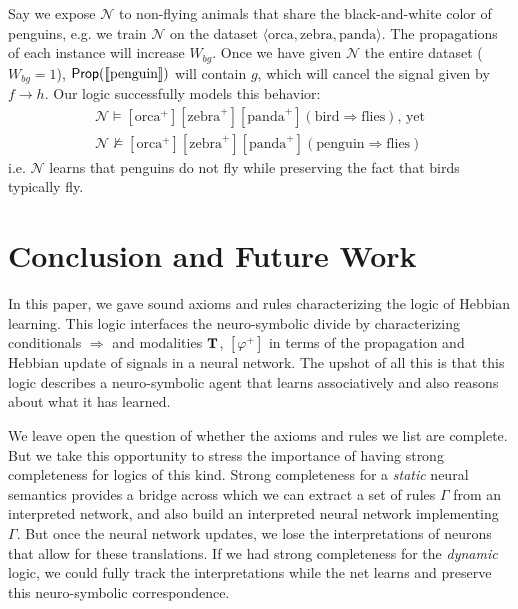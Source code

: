 \documentclass[letterpaper]{article}
\theoremstyle{definition}
\newcommand{\semantics}[1]{[\![\mbox{\em $ #1 $\/}]\!]}
\newcommand{\Typ}{\textrm{\textup{\textbf{T}}}}
\newcommand{\Prop}{\textsf{Prop}}
\newcommand{\Net}{\mathcal{N}}
\begin{document}
Say we expose $\Net$ to non-flying animals that share the black-and-white color of penguins, e.g. we train $\Net$ on the dataset $\langle \textrm{orca}, \textrm{zebra}, \textrm{panda} \rangle$.  The propagations of each instance will increase $W_{bg}$.  Once we have given $\Net$ the entire dataset ($W_{bg} = 1$), $\Prop(\semantics{\textup{penguin}})$ will contain $g$, which will cancel the signal given by ${f \to h}$.  Our logic successfully models this behavior:
\[
\begin{array}{l}
\Net \models [\textrm{orca}^+] [\textrm{zebra}^+] [\textrm{panda}^+] (\textrm{bird} \Rightarrow \textrm{flies}) \textrm{, yet}\\
\Net \not \models [\textrm{orca}^+] [\textrm{zebra}^+] [\textrm{panda}^+] (\textrm{penguin} \Rightarrow \textrm{flies})
\end{array}
\]
i.e. $\Net$ learns that penguins do not fly while preserving the fact that birds typically fly. 


\section{Conclusion and Future Work}

In this paper, we gave sound axioms and rules characterizing the logic of Hebbian learning.  This logic interfaces the neuro-symbolic divide by characterizing conditionals $\Rightarrow$ and modalities $\Typ$, $[\varphi^+]$ in terms of the propagation and Hebbian update of signals in a neural network.  The upshot of all this is that this logic describes a neuro-symbolic agent that learns associatively and also reasons about what it has learned.

We leave open the question of whether the axioms and rules we list are complete.  But we take this opportunity to stress the importance of having strong completeness for logics of this kind.  Strong completeness for a \emph{static} neural semantics provides a bridge across which we can extract a set of rules $\Gamma$ from an interpreted network, and also build an interpreted neural network implementing $\Gamma$.  But once the neural network updates, we lose the interpretations of neurons that allow for these translations.  If we had strong completeness for the \emph{dynamic} logic, we could fully track the interpretations while the net learns and preserve this neuro-symbolic correspondence.
\end{document}
